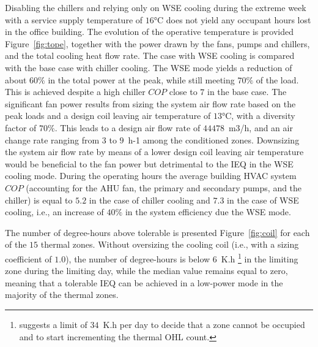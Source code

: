 Disabling the chillers and relying only on WSE cooling during the extreme week with a service supply temperature of $16$°C does not yield any occupant hours lost in the office building.
The evolution of the operative temperature is provided Figure~\ref{fig:tope}, together with the power drawn by the fans, pumps and chillers, and the total cooling heat flow rate. The case with WSE cooling is compared with the base case with chiller cooling.
The WSE mode yields a reduction of about $60\%$ in the total power at the peak, while still meeting $70\%$ of the load.
This is achieved despite a high chiller $COP$ close to $7$ in the base case.
The significant fan power results from sizing the system air flow rate based on the peak loads and a design coil leaving air temperature of $13$°C, with a diversity factor of $70\%$. This leads to a design air flow rate of $44478$~m3/h, and an air change rate ranging from $3$ to $9$~h-1 among the conditioned zones. Downsizing the system air flow rate by means of a lower design coil leaving air temperature would be beneficial to the fan power but detrimental to the IEQ in the WSE cooling mode.
During the operating hours the average building HVAC system $COP$ (accounting for the AHU fan, the primary and secondary pumps, and the chiller) is equal to $5.2$ in the case of chiller cooling and $7.3$ in the case of WSE cooling, i.e., an increase of $40\%$ in the system efficiency due the WSE mode.

The number of degree-hours above tolerable is presented Figure~\ref{fig:coil} for each of the $15$ thermal zones. Without oversizing the cooling coil (i.e., with a sizing coefficient of $1.0$), the number of degree-hours is below $6$~K.h%
\footnote{%
\cite{Mathew2021} suggests a limit of $34$~K.h per day to decide that a zone cannot be occupied and to start incrementing the thermal OHL count.}
in the limiting zone during the limiting day, while the median value remains equal to zero, meaning that a tolerable IEQ can be achieved in a low-power mode in the majority of the thermal zones.

